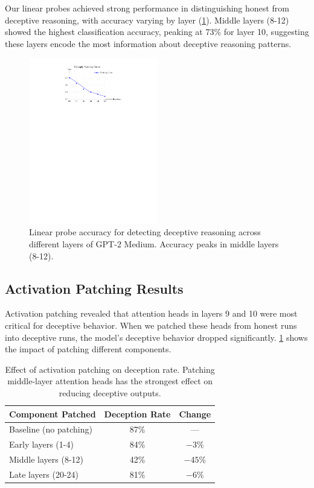 \documentclass[midterm]{sparreport}
\begin{document}
Our linear probes achieved strong performance in distinguishing honest from deceptive reasoning, with accuracy varying by layer (\cref{fig:example}). Middle layers (8-12) showed the highest classification accuracy, peaking at 73\% for layer 10, suggesting these layers encode the most information about deceptive reasoning patterns.

\begin{figure}[t]
  \centering
  \includegraphics[width=0.5\textwidth]{figures/example-figure.pdf}
  \caption{Linear probe accuracy for detecting deceptive reasoning across different layers of GPT-2 Medium. Accuracy peaks in middle layers (8-12).}
  \label{fig:example}
\end{figure}

\subsection{Activation Patching Results}

Activation patching revealed that attention heads in layers 9 and 10 were most critical for deceptive behavior. When we patched these heads from honest runs into deceptive runs, the model's deceptive behavior dropped significantly. \cref{tab:patching} shows the impact of patching different components.

\begin{table}[htbp]
  \centering
  \caption{Effect of activation patching on deception rate. Patching middle-layer attention heads has the strongest effect on reducing deceptive outputs.}
  \label{tab:patching}
  \begin{tabular}{lcc}
    \toprule
    Component Patched & Deception Rate & Change \\
    \midrule
    Baseline (no patching) & 87\% & --- \\
    Early layers (1-4) & 84\% & $-3\%$ \\
    Middle layers (8-12) & 42\% & $-45\%$ \\
    Late layers (20-24) & 81\% & $-6\%$ \\
    \bottomrule
  \end{tabular}
\end{table}
\end{document}
